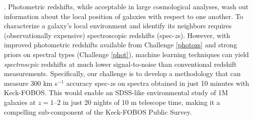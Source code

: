 \documentclass[oneside,11pt]{amsart}
\newcounter{chalno}
\newcommand{\chal}[1]{\refstepcounter{chalno}\label{#1}}
\begin{document}
\medskip
\chal{lowsnr}
.  Photometric redshifts, while acceptable
in large cosmological analyses, wash out information about the local position of galaxies with respect to one another.
To characterize a galaxy's local environment and identify its neighbors requires (observationally expensive)
spectroscopic redshifts (spec-$z$s).  However, with improved photometric redshifts available from Challenge
\ref{photozs} and strong priors on spectral types (Challenge \ref{phot}), machine learning techniques can yield
\emph{spectroscpic} redshifts at much lower signal-to-noise than conventional redshift measurements. Specifically, our
challenge is to develop a methodology that can measure 300 km s$^{-1}$ accuracy spec-$z$s on spectra obtained in just
10 minutes with Keck-FOBOS.  This would enable an SDSS-like environmental study of 1M galaxies at $z=1$--$2$ in just 20
nights of 10 m telescope time, making it a compelling sub-component of the Keck-FOBOS Public Survey.








\end{document}
